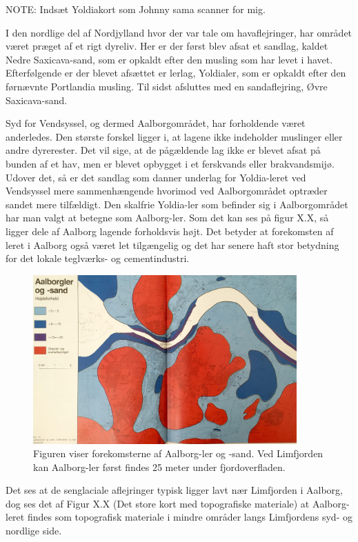 NOTE: Indsæt Yoldiakort som Johnny sama scanner for mig. 


I den nordlige del af Nordjylland hvor der var tale om havaflejringer, har området været præget af et rigt dyreliv. Her er der først blev afsat et sandlag, kaldet Nedre Saxicava-sand, som er opkaldt efter den musling som har levet i havet. Efterfølgende er der blevet afsættet er lerlag, Yoldialer, som er opkaldt efter den førnævnte Portlandia musling. Til sidst afsluttes med en sandaflejring, Øvre Saxicava-sand.

Syd for Vendsyssel, og dermed Aalborgområdet, har forholdende været anderledes. Den største forskel ligger i, at lagene ikke indeholder muslinger eller andre dyrerester. Det vil sige, at de pågældende lag ikke er blevet afsat på bunden af et hav, men er blevet opbygget i et ferskvands eller brakvandsmijø. Udover det, så er det sandlag som danner underlag for Yoldia-leret ved Vendsyssel mere sammenhængende hvorimod ved Aalborgområdet optræder sandet mere tilfældigt. Den skalfrie Yoldia-ler  som befinder sig  i Aalborgområdet har man valgt at betegne som Aalborg-ler. Som det kan ses på figur X.X, så ligger dele af Aalborg lagende forholdsvis højt. Det betyder at forekomsten af leret i Aalborg også været let tilgængelig og det har senere haft stor betydning for det lokale teglværks- og cementindustri. 

\begin{figure}[H] 
\centering
\includegraphics[width=0.90\textwidth]{billeder/GHU4}
\caption{Figuren viser forekomsterne af Aalborg-ler og -sand. Ved Limfjorden kan Aalborg-ler først findes 25 meter under fjordoverfladen.}
\label{fig:GHU4}
\end{figure}

Det ses at de senglaciale aflejringer typisk ligger lavt nær Limfjorden i Aalborg, dog ses det af Figur X.X (Det store kort med topografiske materiale) at Aalborg-leret findes som topografisk materiale i mindre områder langs Limfjordens syd- og nordlige side. 

